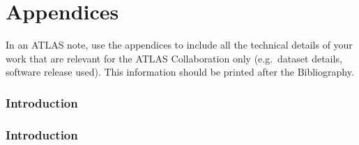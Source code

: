 \documentclass[NOTE, atlasdraft=true, texlive=2016, UKenglish]{\ATLASLATEXPATH atlasdoc}
\begin{document}
\clearpage
\appendix
\part*{Appendices}

In an ATLAS note, use the appendices to include all the technical details of your work
that are relevant for the ATLAS Collaboration only (e.g.\ dataset details, software release used).
This information should be printed after the Bibliography.
\section{Introduction}
\label{sec:intro}
\section{Introduction}
\label{sec:intro}
\end{document}
